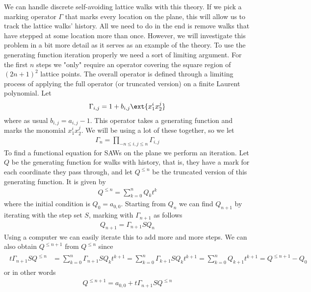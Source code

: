 We can handle discrete self-avoiding lattice walks with this theory. If we pick a marking operator $\Gamma$ that marks every location on the plane, this will allow us to track the lattice walks' history. All we need to do in the end is remove walks that have stepped at some location more than once. However, we will investigate this problem in a bit more detail as it serves as an example of the theory. To use the generating function iteration properly we need a sort of limiting argument. For the first $n$ steps we "only" require an operator covering the square region of $(2n+1)^2$ lattice points. The overall operator is defined through a limiting process of applying the full operator (or truncated version) on a finite Laurent polynomial. Let
\begin{align}
\Gamma_{i,j} = 1+b_{i,j}\ext{x_1^ix_2^j}
\end{align}
where as usual $b_{i,j} = a_{i,j}-1$. This operator takes a generating function and marks the monomial $x_1^ix_2^j$. We will be using a lot of these together, so we let
\begin{align}
\Gamma_n = \prod_{-n\leq i,j\leq n}\Gamma_{i,j}
\end{align}
To find a functional equation for SAWs on the plane we perform an iteration. Let $Q$ be the generating function for walks with history, that is, they have a mark for each coordinate they pass through, and let $Q^{\leq n}$ be the truncated version of this generating function. It is given by
\begin{align}
Q^{\leq n} = \sum_{k=0}^{n} Q_k t^k
\end{align}
where the initial condition is $Q_0 = a_{0,0}$. Starting from $Q_n$ we can find $Q_{n+1}$ by iterating with the step set $S$, marking with $\Gamma_{n+1}$ as follows
\begin{align}
	Q_{n+1} = \Gamma_{n+1}SQ_n
\end{align}
Using a computer we can easily iterate this to add more and more steps. We can also obtain $Q^{\leq n+1}$ from $Q^{\leq n}$ since
\begin{align}\begin{split}
	t\Gamma_{n+1}SQ^{\leq n} & = \sum_{k=0}^n \Gamma_{n+1}SQ_kt^{k+1}= \sum_{k=0}^n \Gamma_{k+1}SQ_kt^{k+1} = \sum_{k=0}^n Q_{k+1}t^{k+1} = Q^{\leq n+1}-Q_0
\end{split}\end{align}
or in other words
\begin{align}
	 Q^{\leq n+1} = a_{0,0} + t\Gamma_{n+1}SQ^{\leq n}
\end{align}
